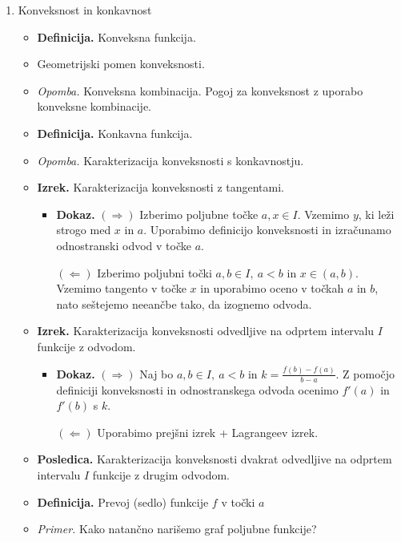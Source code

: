 \begin{enumerate}
    \newpage
    \item Konveksnost in konkavnost
    \begin{itemize}
        \item \colorbox{purple!30}{\textbf{Definicija.}} Konveksna funkcija.
        \item Geometrijski pomen konveksnosti.
        \item \colorbox{yellow!30}{\emph{Opomba.}} Konveksna kombinacija. Pogoj za konveksnost z uporabo konveksne kombinacije.
        \item \colorbox{purple!30}{\textbf{Definicija.}} Konkavna funkcija.
        \item \colorbox{yellow!30}{\emph{Opomba.}} Karakterizacija konveksnosti s konkavnostju.
        \item \colorbox{blue!30}{\textbf{Izrek.}} Karakterizacija konveksnosti z tangentami.
        \begin{itemize}
            \item \colorbox{green!30}{\textbf{Dokaz.}} $(\Rightarrow)$ Izberimo poljubne točke $a, x \in I$. Vzemimo $y$, ki leži strogo med $x$ in $a$. Uporabimo definicijo konveksnosti in izračunamo odnostranski odvod v točke $a$.
            
            $(\Leftarrow)$ Izberimo poljubni točki $a, b \in I, \ a<b$ in $x \in (a,b)$. Vzemimo tangento v točke $x$ in uporabimo oceno v točkah $a$ in $b$, nato seštejemo neeančbe tako, da izognemo odvoda.
        \end{itemize}
        \item \colorbox{blue!30}{\textbf{Izrek.}} Karakterizacija konveksnosti odvedljive na odprtem intervalu $I$ funkcije z odvodom.
        \begin{itemize}
            \item \colorbox{green!30}{\textbf{Dokaz.}} $(\Rightarrow)$ Naj bo $a, b \in I, \ a < b$ in $k = \frac{f(b) - f(a)}{b-a}$. Z pomočjo definiciji konveksnosti in odnostranskega odvoda ocenimo $f'(a)$ in $f'(b)$ s $k$.
            
            $(\Leftarrow)$ Uporabimo prejšni izrek + Lagrangeev izrek.
        \end{itemize}
        \item \colorbox{orange!30}{\textbf{Posledica.}} Karakterizacija konveksnosti dvakrat odvedljive na odprtem intervalu $I$ funkcije z drugim odvodom.
        \item \colorbox{purple!30}{\textbf{Definicija.}} Prevoj (sedlo) funkcije $f$ v točki $a$
        \item \colorbox{yellow!30}{\emph{Primer.}} Kako natančno narišemo graf poljubne funkcije?
    \end{itemize}


\end{enumerate}
